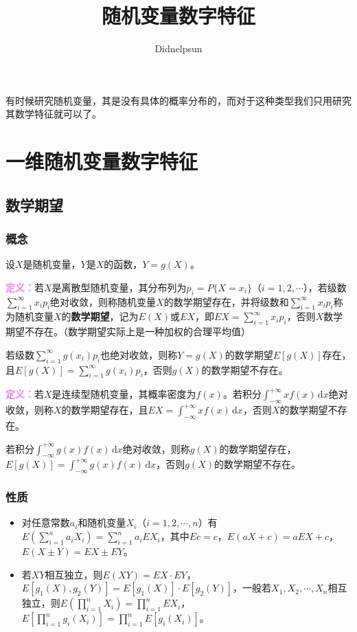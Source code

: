 \documentclass[UTF8, 12pt]{ctexart}
\author{Didnelpsun}
\title{随机变量数字特征}
\date{}
\begin{document}
\maketitle
\pagestyle{empty}
\thispagestyle{empty}
\tableofcontents
\thispagestyle{empty}
\newpage
\pagestyle{plain}
\setcounter{page}{1}

有时候研究随机变量，其是没有具体的概率分布的，而对于这种类型我们只用研究其数学特征就可以了。

\section{一维随机变量数字特征}

\subsection{数学期望}

\subsubsection{概念}

设$X$是随机变量，$Y$是$X$的函数，$Y=g(X)$。

\textcolor{violet}{\textbf{定义：}}若$X$是离散型随机变量，其分布列为$p_i=P\{X=x_i\}$（$i=1,2,\cdots$），若级数$\sum\limits_{i=1}^\infty x_ip_i$绝对收敛，则称随机变量$X$的数学期望存在，并将级数和$\sum\limits_{i=1}^\infty x_ip_i$称为随机变量$X$的\textbf{数学期望}，记为$E(X)$或$EX$，即$EX=\sum\limits_{i=1}^\infty x_ip_i$，否则$X$数学期望不存在。（数学期望实际上是一种加权的合理平均值）

若级数$\sum\limits_{i=1}^\infty g(x_i)p_i$也绝对收敛，则称$Y=g(X)$的数学期望$E[g(X)]$存在，且$E[g(X)]=\sum\limits_{i=1}^\infty g(x_i)p_i$，否则$g(X)$的数学期望不存在。

\textcolor{violet}{\textbf{定义：}}若$X$是连续型随机变量，其概率密度为$f(x)$。若积分$\int_{-\infty}^{+\infty}xf(x)\,\textrm{d}x$绝对收敛，则称$X$的数学期望存在，且$EX=\int_{-\infty}^{+\infty}xf(x)\,\textrm{d}x$，否则$X$的数学期望不存在。

若积分$\int_{-\infty}^{+\infty}g(x)f(x)\,\textrm{d}x$绝对收敛，则称$g(X)$的数学期望存在，$E[g(X)]=\int_{-\infty}^{+\infty}g(x)f(x)\,\textrm{d}x$，否则$g(X)$的数学期望不存在。

\subsubsection{性质}

\begin{itemize}
    \item 对任意常数$a_i$和随机变量$X_i$（$i=1,2,\cdots,n$）有$E\left(\sum\limits_{i=1}^na_iX_i\right)=\sum\limits_{i=1}^na_iEX_i$，其中$Ec=c$，$E(aX+c)=aEX+c$，$E(X\pm Y)=EX\pm EY$。
    \item 若$XY$相互独立，则$E(XY)=EX\cdot EY$，$E[g_1(X),g_2(Y)]=E[g_1(X)]\cdot E[g_2(Y)]$，一般若$X_1,X_2,\cdots,X_n$相互独立，则$E\left(\prod\limits_{i=1}^nX_i\right)=\prod\limits_{i=1}^nEX_i$，$E\left[\prod\limits_{i=1}^ng_i(X_i)\right]=\prod\limits_{i=1}^nE[g_i(X_i)]$。
\end{itemize}
\end{document}
